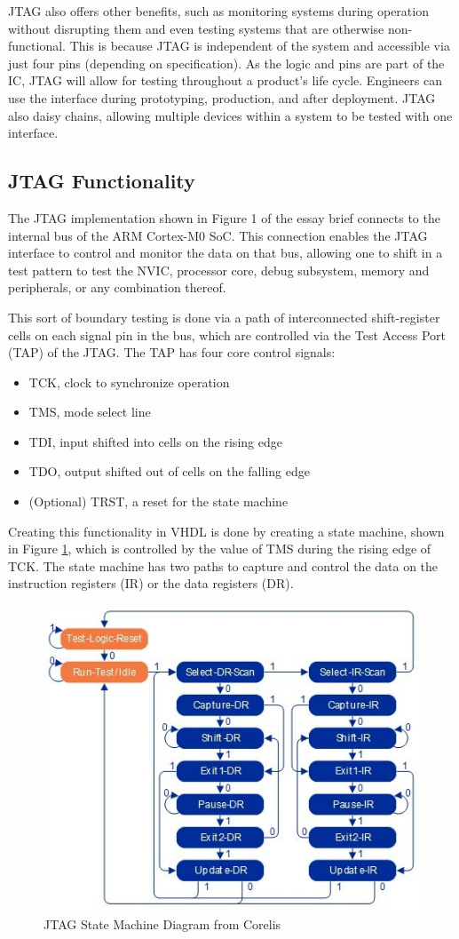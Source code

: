 \documentclass[11pt]{article}
\begin{document}
JTAG also offers other benefits, such as monitoring systems during operation without disrupting them and even testing systems that are otherwise non-functional\cite{Corelis}.
This is because JTAG is independent of the system and accessible via just four pins (depending on specification).
As the logic and pins are part of the IC, JTAG will allow for testing throughout a product's life cycle.
Engineers can use the interface during prototyping, production, and after deployment\cite{Corelis}.
JTAG also daisy chains, allowing multiple devices within a system to be tested with one interface.

\subsection{JTAG Functionality}
The JTAG implementation shown in Figure 1 of the essay brief connects to the internal bus of the ARM Cortex-M0 SoC.
This connection enables the JTAG interface to control and monitor the data on that bus, allowing one to shift in a test pattern to test
the NVIC, processor core, debug subsystem, memory and peripherals, or any combination thereof. 

This sort of boundary testing is done via a path of interconnected shift-register cells on each signal pin in the bus, which are controlled via the Test Access Port (TAP) of the JTAG.
The TAP has four core control signals\cite{jtag}:
\begin{itemize}
    \item TCK, clock to synchronize operation
    \item TMS, mode select line
    \item TDI, input shifted into cells on the rising edge
    \item TDO, output shifted out of cells on the falling edge 
    \item (Optional) TRST, a reset for the state machine 
\end{itemize}

Creating this functionality in VHDL is done by creating a state machine, shown in Figure \ref{fig:sm}, which is controlled by the value of TMS during the rising edge of TCK.
The state machine has two paths to capture and control the data on the instruction registers (IR) or the data registers (DR).

\begin{figure}[H]        
    \centering
    \includegraphics[width=.5\textwidth]{JTAG-state-machine-diagram1.jpg}
    \caption{JTAG State Machine Diagram from Corelis\cite{Corelis}}
    \label{fig:sm}
\end{figure} 
\end{document}
